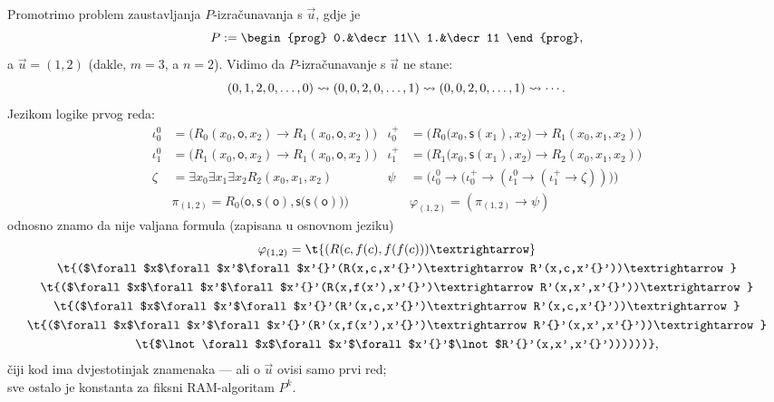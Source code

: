 \begin{primjer}[{name=[zaustavljanje RAM-izračunavanja kao valjanost jedne formule]}]
Promotrimo problem zaustavljanja $P$-izračunavanja s $\vec u$, gdje je
\begin{equation}
    P:=\begin{prog}
    0.&\decr11\\
    1.&\decr11
    \end{prog}\text,
\end{equation}
    a $\vec u=(1,2)$ (dakle, $m=3$, a $n=2$). Vidimo da $P$-izračunavanje s $\vec u$ ne stane:
\begin{equation}
    (0,1,2,0,\dotsc,0)\leadsto(0,0,2,0,\dotsc,1)\leadsto(0,0,2,0,\dotsc,1)\leadsto\dotsb\text.
\end{equation}
Jezikom logike prvog reda:
\begin{align}
	\iota_0^0&=\bigl(R_0(x_0,\mathsf o,x_2)\to R_1(x_0,\mathsf o,x_2)\bigr)&
    \iota_0^+&=\bigl(R_0\bigl(x_0,\mathsf s(x_1),x_2\bigr)\to R_1(x_0,x_1,x_2)\bigr)\\
	\iota_1^0&=\bigl(R_1(x_0,\mathsf o,x_2)\to R_1(x_0,\mathsf o,x_2)\bigr)&
    \iota_1^+&=\bigl(R_1\bigl(x_0,\mathsf s(x_1),x_2\bigr)\to R_2(x_0,x_1,x_2)\bigr)\\
	\zeta&=\exists x_0\exists x_1\exists x_2 R_2(x_0,x_1,x_2)&
    \psi&=\bigl(\iota_0^0\to\bigl(\iota_0^+\to(\iota_1^0\to(\iota_1^+\to\zeta))\bigl)\bigl)\\
	&\pi_{(1,2)}=R_0\bigl(\mathsf o,\mathsf s(\mathsf o),\mathsf s\bigl(\mathsf s(\mathsf o)\bigr)\bigr)&
	&\varphi_{(1,2)}=(\pi_{(1,2)}\to\psi)
\end{align}
    odnosno znamo da nije valjana formula (zapisana u osnovnom jeziku)
\begin{multline}
    \varphi_{(1,2)}=\t{(R(c,f(c),f(f(c)))\textrightarrow}\\
    \t{($\forall$x$\forall$x'$\forall$x'{}'(R(x,c,x'{}')\textrightarrow R'(x,c,x'{}'))\textrightarrow}\\
    \t{($\forall$x$\forall$x'$\forall$x'{}'(R(x,f(x'),x'{}')\textrightarrow R'(x,x',x'{}'))\textrightarrow}\\
    \t{($\forall$x$\forall$x'$\forall$x'{}'(R'(x,c,x'{}')\textrightarrow R'(x,c,x'{}'))\textrightarrow}\\
    \t{($\forall$x$\forall$x'$\forall$x'{}'(R'(x,f(x'),x'{}')\textrightarrow R'{}'(x,x',x'{}'))\textrightarrow}\\
    \t{$\lnot\forall$x$\forall$x'$\forall$x'{}'$\lnot$R'{}'(x,x',x'{}'))))))}\text,
\end{multline}
čiji kod ima dvjestotinjak znamenaka --- ali o $\vec u$ ovisi samo prvi red;\\ sve ostalo je konstanta za fiksni RAM-algoritam $P^k$.
\end{primjer}


